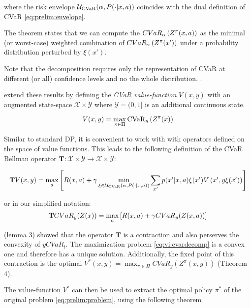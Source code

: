 where the risk envelope $\mathcal{U}_{\text{CVaR}}(\alpha, P(\cdot | x, a))$ coincides with the dual definition of CVaR \ref{eq:prelim:envelope}.

The theorem states that we can compute the $CVaR_\alpha\left( {Z^\pi(x, a)} \right)$ as the minimal (or worst-case) weighted combination of $CVaR_\alpha\left( {Z^\pi(x')} \right)$ under a probability distribution perturbed by $\xi(x')$.

Note that the decomposition requires only the representation of CVaR at different (or all) confidence levels and no the whole distribution. .

\citet{chow2015risk} extend these results by defining the \emph{CVaR value-function} $V(x, y)$ with an augmented state-space $\mathcal{X}\times\mathcal{Y}$ where $\mathcal{Y}=(0,1]$ is an additional continuous state.

\begin{equation}
V(x, y)=\max_{\pi \in \Pi} \text{CVaR}_{y}\left( {Z^\pi(x)} \right)
\end{equation}

Similar to standard DP, it is convenient to work with with operators defined on the space of value functions. This leads to the following definition of the CVaR Bellman operator $\mathbf{T}:\mathcal{X}\times\mathcal{Y}\to\mathcal{X}\times\mathcal{Y}$:

\begin{equation}
\mathbf{T}V(x, y) = \max_a \left[ { R(x, a) + \gamma \min_{\xi \in \mathcal{U}_{\text{CVaR}}(\alpha, P(\cdot | x, a))} \sum_{x'} p(x'| x, a)\xi(x') V\left( {x', y\xi(x')} \right)} \right]
\end{equation}

or in our simplified notation:
\begin{equation}\label{eq:vi:tcvar}
\mathbf{T} CVaR_y(Z(x))=\max_a \left[ {R(x, a) + \gamma CVaR_{y}(Z(x, a))} \right]
\end{equation}

\citep{chow2015risk}(lemma 3) showed that the operator $\mathbf{T}$ is a contraction and also perserves the convexity of $y CVaR_t$. The maximization problem \ref{eq:vi:cvardecomp} is a convex one and therefore has a unique solution. Additionally, the fixed point of this contraction is the optimal $V^*(x, y) = \max_{\pi \in \Pi} CVaR_y (Z^\pi(x, y))$ (Theorem 4).
 
The value-function $V^*$ can then be used to extract the optimal policy $\pi^*$ of the original problem \ref{eq:prelim:problem}, using the following theorem

